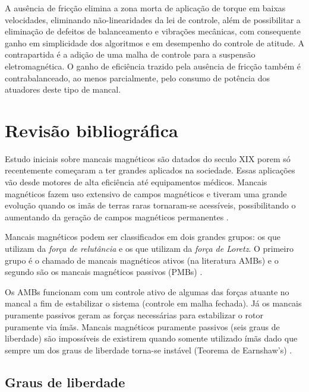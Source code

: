 A ausência de fricção elimina a zona morta de aplicação de torque em baixas velocidades, eliminando não-linearidades da lei de controle, além de possibilitar a eliminação de defeitos de balanceamento e vibrações mecânicas, com consequente ganho em simplicidade dos algoritmos e em desempenho do controle de atitude. A contrapartida é a adição de uma malha de controle para a suspensão eletromagnética. O ganho de eficiência trazido pela ausência de fricção também é contrabalanceado, ao menos parcialmente, pelo consumo de potência dos atuadores deste tipo de mancal.


\section{Revisão bibliográfica}


Estudo iniciais sobre mancais magnéticos são datados do seculo XIX \citep{Weise1989} porem só recentemente começaram a ter grandes aplicados na sociedade. Essas aplicações vão desde motores de alta eficiência até equipamentos médicos. Mancais magnéticos fazem uso extensivo de campos magnéticos e tiveram uma grande evolução quando os imãs de terras raras tornaram-se acessíveis, possibilitando o aumentando da geração de campos magnéticos permanentes \cite{Furlani2001}.

Mancais magnéticos podem ser classificados em dois grandes grupos: os que utilizam da \textit{força de relutância} e os que utilizam da \textit{força de Loretz}. O primeiro grupo é o chamado de mancais magnéticos ativos (na literatura AMBs) e o segundo são os mancais magnéticos passivos (PMBs) \cite{Schweitzer2009}.

Os AMBs funcionam com um controle ativo de algumas das forças atuante no mancal a fim de estabilizar o sistema (controle em malha fechada). Já os mancais puramente passivos geram as forças necessárias para estabilizar o rotor puramente via ímãs.
Mancais magnéticos puramente passivos (seis graus de liberdade) são impossíveis de existirem quando somente utilizado ímãs dado que sempre um dos graus de liberdade torna-se instável (Teorema de Earnshaw's) .




\subsection{Graus de liberdade}

